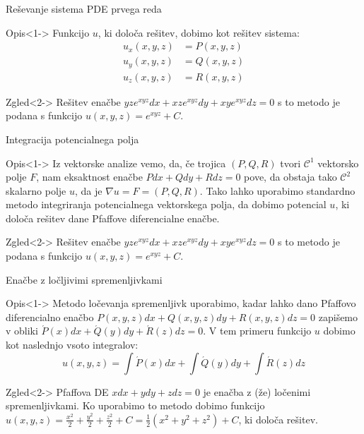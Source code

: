\documentclass[t, 8pt]{beamer} %
\newcommand{\fillblack}[1]{
	\begin{tikzpicture}[remember picture, overlay]
		\node [shift={(0 cm,0cm)}]  at (current page.south west)
		{%
			\begin{tikzpicture}[remember picture, overlay] at (current page.south west)
				\draw [fill=black] (0, 0) -- (0,#1 \paperheight) --
				(\paperwidth,#1 \paperheight) -- (\paperwidth,0) -- cycle ;
			\end{tikzpicture}
		};
		\draw (current page.north west) rectangle (current page.south east);
	\end{tikzpicture}
}
\begin{document}
		\begin{frame}{Reševanje sistema PDE prvega reda}
			\begin{block}{Opis}<1->
				Funkcijo $u$, ki določa rešitev, dobimo kot rešitev sistema: 
				\begin{align*}
					u_x(x, y, z) &= P(x, y, z) \\
					u_y(x, y, z) &= Q(x, y, z) \\
					u_z(x, y, z) &= R(x, y, z) 
				\end{align*}
			\end{block}
			\begin{block}{Zgled}<2->
				Rešitev enačbe $yze^{xyz}dx + xze^{xyz}dy + xye^{xyz}dz = 0$ s to metodo je podana s funkcijo $u(x, y, z) = e^{xyz} + C$.
			\end{block}
		\end{frame}
		
		\begin{frame}{Integracija potencialnega polja}
			\begin{block}{Opis}<1->
				Iz vektorske analize vemo, da, če trojica $(P, Q, R)$ tvori $\mathcal{C}^1$ vektorsko polje $F$, nam eksaktnost enačbe $Pdx + Qdy + Rdz = 0$ pove, da obstaja tako $\mathcal{C}^2$ skalarno polje $u$, da je $\nabla u = F = (P, Q, R)$. Tako lahko uporabimo standardno metodo integriranja potencialnega vektorskega polja, da dobimo potencial $u$, ki določa rešitev dane Pfaffove diferencialne enačbe.
			\end{block}
			\begin{block}{Zgled}<2->
					Rešitev enačbe $yze^{xyz}dx + xze^{xyz}dy + xye^{xyz}dz = 0$ s to metodo je podana s funkcijo $u(x, y, z) = e^{xyz} + C$.
			\end{block}
		\end{frame}
		
		\begin{frame}{Enačbe z ločljivimi spremenljivkami}
			\begin{block}{Opis}<1->
					Metodo ločevanja spremenljivk uporabimo, kadar lahko dano Pfaffovo diferencialno enačbo $P(x, y, z)dx + Q(x, y, z)dy + R(x, y, z)dz = 0$ zapišemo v obliki $\acute{P}(x)dx + \acute{Q}(y)dy + \acute{R}(z)dz = 0$. V tem primeru funkcijo $u$ dobimo kot naslednjo vsoto integralov: $$u(x, y, z) = \int \acute{P}(x)dx + \int \acute{Q}(y)dy + \int \acute{R}(z)dz$$
			\end{block}
			\begin{block}{Zgled}<2->
				Pfaffova DE $xdx + ydy + zdz = 0$ je enačba z (že) ločenimi spremenljivkami. Ko uporabimo to metodo dobimo funkcijo $u(x, y, z) = \frac{x^2}{2} + \frac{y^2}{2} + \frac{z^2}{2} + C = \frac{1}{2}(x^2 + y^2 + z^2) + C$, ki določa rešitev.
			\end{block}
		\end{frame}
		
\end{document}
